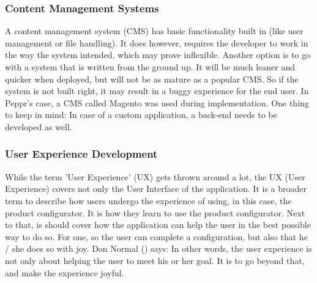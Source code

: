 \subsubsection{Content Management Systems}
A content management system (CMS) has basic functionality built in (like user management or file handling). It does however, requires the developer to work in the way the system intended, which may prove inflexible. Another option is to go with a system that is written from the ground up. It will be much leaner and quicker when deployed, but will not be as mature as a popular CMS. So if the system is not built right, it may result in a buggy experience for the end user. In Peppr's case, a CMS called Magento was used during implementation. One thing to keep in mind: In case of a custom application, a back-end needs to be developed as well.
\subsubsection{User Experience Development}
While the term 'User Experience' (UX) gets thrown around a lot, the UX (User Experience) covers not only the User Interface of the application. It is a broader term to describe how users undergo the experience of using, in this case, the product configurator. It is how they learn to use the product configurator. Next to that, is should cover how the application can help the user in the best possible way to do so. For one, so the user can complete a configuration, but also that he / she does so with joy. Don Normal (\cite{userExperience}) says: \newline
{} \newline
In other words, the user experience is not only about helping the user to meet his or her goal. It is to go beyond that, and make the experience joyful.

